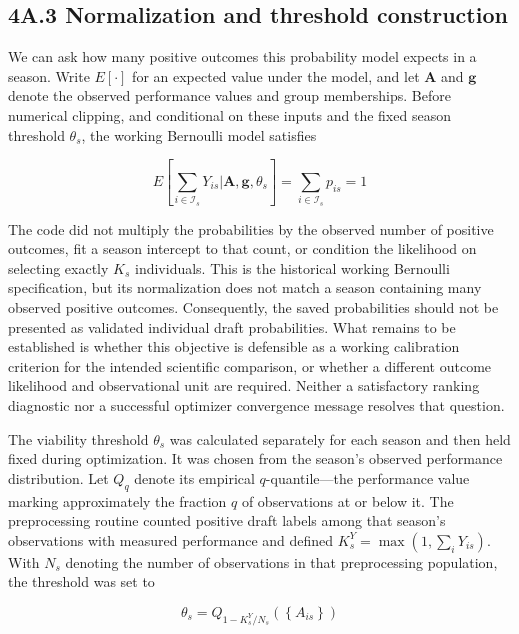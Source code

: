 \subsection*{4A.3 Normalization and threshold construction}\label{a.3-normalization-and-threshold-construction}

We can ask how many positive outcomes this probability model expects in a season. Write \(E[\cdot]\) for an expected value under the model, and let \(\mathbf A\) and \(\mathbf g\) denote the observed performance values and group memberships. Before numerical clipping, and conditional on these inputs and the fixed season threshold \(\theta_{s}\), the working Bernoulli model satisfies

\[
E\left\lbrack \sum_{i \in \mathcal{I}_{s}}^{}Y_{is}|\mathbf{A},\mathbf{g},\theta_{s} \right\rbrack = \sum_{i \in \mathcal{I}_{s}}^{}p_{is} = 1
\]

The code did not multiply the probabilities by the observed number of positive outcomes, fit a season intercept to that count, or condition the likelihood on selecting exactly \(K_{s}\) individuals. This is the historical working Bernoulli specification, but its normalization does not match a season containing many observed positive outcomes. Consequently, the saved probabilities should not be presented as validated individual draft probabilities. What remains to be established is whether this objective is defensible as a working calibration criterion for the intended scientific comparison, or whether a different outcome likelihood and observational unit are required. Neither a satisfactory ranking diagnostic nor a successful optimizer convergence message resolves that question.

The viability threshold \(\theta_s\) was calculated separately for each season and then held fixed during optimization. It was chosen from the season's observed performance distribution. Let \(Q_q\) denote its empirical \(q\)-quantile---the performance value marking approximately the fraction \(q\) of observations at or below it. The preprocessing routine counted positive draft labels among that season's observations with measured performance and defined \(K_s^Y=\max(1,\sum_i Y_{is})\). With \(N_s\) denoting the number of observations in that preprocessing population, the threshold was set to

\[
\theta_{s} = Q_{1 - K_{s}^{Y}/N_{s}}\left( \left\{ A_{is} \right\} \right)
\]

